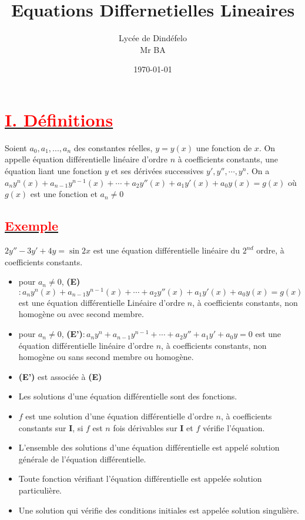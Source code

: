 \documentclass{article}
\author{Lycée de Dindéfelo\\Mr BA}
\title{\textbf{Equations Differnetielles Lineaires}}
\date{\today}
\begin{document}
\maketitle
\newpage
\section*{\underline{\textbf{\textcolor{red}{I. Définitions}}}}
Soient $a_{0},a_{1},...,a_{n}$ des constantes réelles, $y=y(x)$ une fonction de 
$x$. On appelle équation différentielle linéaire d'ordre $n$ à coefficients constants, une équation liant une fonction $y$ et ses dérivées successives $y',y'',\cdots , y^{n}$. On a $a_{n}y^{n}(x)+a_{n-1}y^{n-1}(x)+\cdots +a_{2}y''(x)+a_{1}y'(x)+a_{0}y(x)=g(x)$ où $g(x)$ est une fonction et $a_{n}\neq 0$
\subsection*{\underline{\textbf{\textcolor{red}{Exemple}}}}
$2y''-3y'+4y=\sin 2x$ est une équation différentielle linéaire du $2^{nd}$ ordre, à coefficients constants.
\begin{itemize}
    \item pour $a_{n}\neq 0$, \textbf{(E)}$:a_{n}y^{n}(x)+a_{n-1}y^{n-1}(x)+\cdots+a_{2}y''(x)+a_{1}y'(x)+a_{0}y(x)=g(x)$ est une équation différentielle Linéaire d'ordre $n$, à coefficients constants, non homogène ou avec second membre. 
    \item pour $a_{n}\neq 0$, \textbf{(E')}$:a_{n}y^{n}+a_{n-1}y^{n-1}+\cdots+a_{2}y''+a_{1}y'+a_{0}y=0$ est une équation différentielle linéaire d'ordre $n$, à coefficients constants, non homogène ou sans second membre ou homogène. 	   
    \item \textbf{(E')} est associée à \textbf{(E)}
    \item  Les solutions d'une équation différentielle sont des fonctions.
    \item $f$ est une solution d'une équation différentielle d'ordre $n$, à coefficients constants sur \textbf{I}, si $f$ est $n$ fois dérivables sur \textbf{I} et $f$ vérifie l'équation.
    \item L'ensemble des solutions d'une équation différentielle est appelé solution générale de l'équation différentielle.
    \item Toute fonction vérifiant l'équation différentielle est appelée solution particulière.
    \item Une solution qui vérifie des conditions initiales est appelée solution singulière.
\end{itemize}
\end{document}
